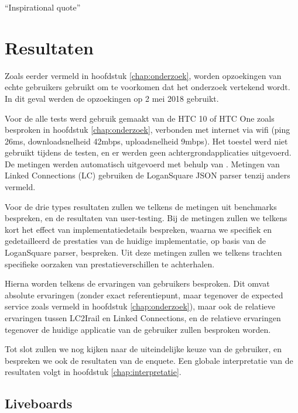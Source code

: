 \begin{savequote}[0.55\linewidth]
	``Inspirational quote''
\end{savequote}

\chapter{Resultaten}
\label{chap:resultaten}

Zoals eerder vermeld in hoofdstuk \ref{chap:onderzoek}, worden opzoekingen van echte gebruikers gebruikt om te voorkomen dat het onderzoek vertekend wordt. In dit geval werden de opzoekingen op 2 mei 2018 gebruikt.

Voor de alle tests werd gebruik gemaakt van de HTC 10 of HTC One zoals besproken in hoofdstuk \ref{chap:onderzoek}, verbonden met internet via wifi (ping 26ms, downloadsnelheid 42mbps, uploadsnelheid 9mbps). Het toestel werd niet gebruikt tijdens de testen, en er werden geen achtergrondapplicaties uitgevoerd. De metingen werden automatisch uitgevoerd met behulp van . Metingen van Linked Connections (LC) gebruiken de LoganSquare JSON parser tenzij anders vermeld.

Voor de drie types resultaten zullen we telkens de metingen uit benchmarks bespreken, en de resultaten van user-testing. Bij de metingen zullen we telkens kort het effect van implementatiedetails bespreken, waarna we specifiek en gedetailleerd de prestaties van de huidige implementatie, op basis van de LoganSquare parser, bespreken. Uit deze metingen zullen we telkens trachten specifieke oorzaken van prestatieverschillen te achterhalen.

Hierna worden telkens de ervaringen van gebruikers besproken. Dit omvat absolute ervaringen (zonder exact referentiepunt, maar tegenover de expected service zoals vermeld in hoofdstuk \ref{chap:onderzoek}), maar ook de relatieve ervaringen tussen LC2Irail en Linked Connections, en de relatieve ervaringen tegenover de huidige applicatie van de gebruiker zullen besproken worden.

Tot slot zullen we nog kijken naar de uiteindelijke keuze van de gebruiker, en bespreken we ook de resultaten van de enquete. Een globale interpretatie van de resultaten volgt in hoofdstuk \ref{chap:interpretatie}.

\section{Liveboards}
